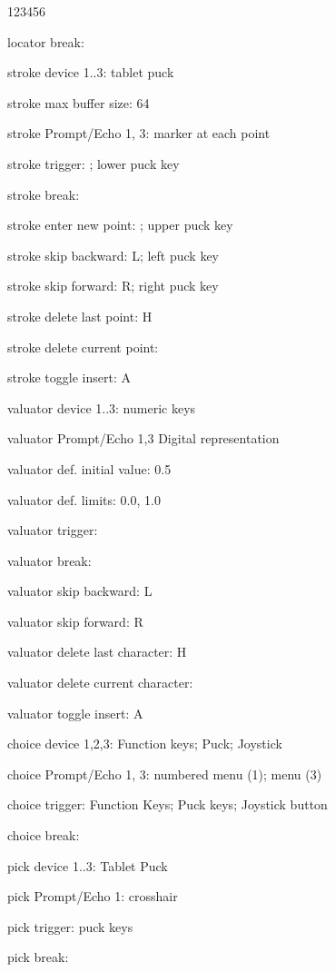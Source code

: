 \begin{DLtt}{123456}
\item[locator break:]
\item[stroke device 1..3:]tablet puck
\item[stroke max buffer size:]64
\item[stroke Prompt/Echo 1, 3:]marker at each point
\item[stroke trigger:]; lower puck key
\item[stroke break:]
\item[stroke enter new point:]; upper puck key
\item[stroke skip backward:]L; left puck key
\item[stroke skip forward:]R; right puck key
\item[stroke delete last point:]H
\item[stroke delete current point:]
\item[stroke toggle insert:]A
\item[valuator device 1..3:]numeric keys
\item[valuator Prompt/Echo 1,3]Digital representation
\item[valuator def. initial value:]0.5
\item[valuator def. limits:]0.0, 1.0
\item[valuator trigger:]
\item[valuator break:]
\item[valuator skip backward:]L
\item[valuator skip forward:]R
\item[valuator delete last character:]H
\item[valuator delete current character:]
\item[valuator toggle insert:]A
\item[choice device 1,2,3:]Function keys; Puck; Joystick
\item[choice Prompt/Echo 1, 3:]numbered menu (1); menu (3)
\item[choice trigger:]Function Keys; Puck keys; Joystick button
\item[choice break:]
\item[pick device 1..3:]Tablet Puck
\item[pick Prompt/Echo 1:]crosshair
\item[pick trigger:]puck keys
\item[pick break:]

\end{DLtt}
